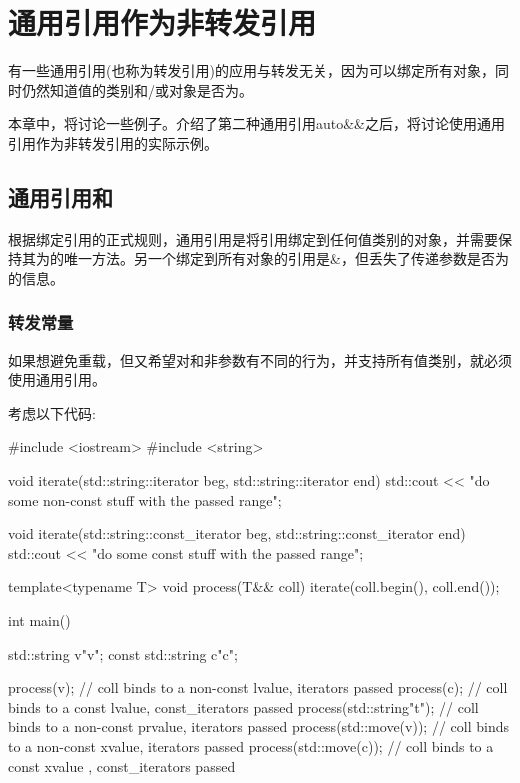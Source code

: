 \section{通用引用作为非转发引用}
有一些通用引用(也称为转发引用)的应用与转发无关，因为可以绑定所有对象，同时仍然知道值的类别和/或对象是否为。

本章中，将讨论一些例子。介绍了第二种通用引用auto\&\&之后，将讨论使用通用引用作为非转发引用的实际示例。

\subsection{通用引用和}

根据绑定引用的正式规则，通用引用是将引用绑定到任何值类别的对象，并需要保持其为的唯一方法。另一个绑定到所有对象的引用是\&，但丢失了传递参数是否为的信息。

\subsubsection{转发常量}

如果想避免重载，但又希望对和非参数有不同的行为，并支持所有值类别，就必须使用通用引用。

考虑以下代码:

\begin{cppcode}
#include <iostream>
#include <string>

void iterate(std::string::iterator beg, std::string::iterator end)
{
	std::cout << "do some non-const stuff with the passed range\n";
}

void iterate(std::string::const_iterator beg, std::string::const_iterator end)
{
	std::cout << "do some const stuff with the passed range\n";
}

template<typename T>
void process(T&& coll)
{
	iterate(coll.begin(), coll.end());
}

int main()
{
	std::string v{"v"};
	const std::string c{"c"};

	process(v); // coll binds to a non-const lvalue, iterators passed
	process(c); // coll binds to a const lvalue, const_iterators passed
	process(std::string{"t"}); // coll binds to a non-const prvalue, iterators passed
	process(std::move(v)); // coll binds to a non-const xvalue, iterators passed
	process(std::move(c)); // coll binds to a const xvalue , const_iterators passed
}
\end{cppcode}

